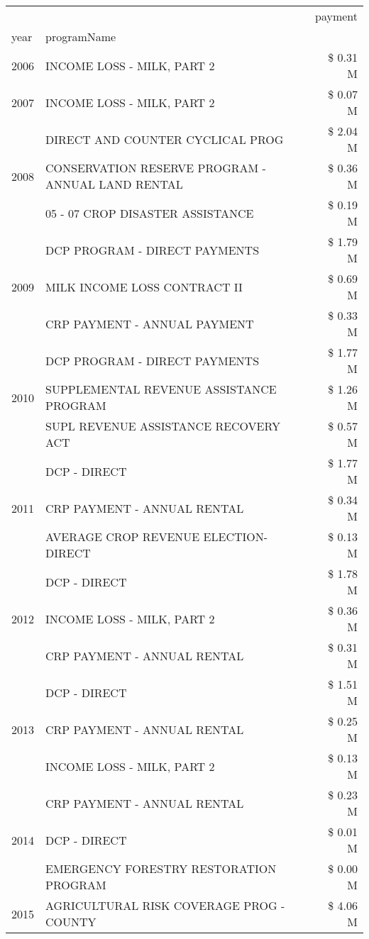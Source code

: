\begin{tabular}{llr}
\toprule
 &  & payment \\
year & programName &  \\
\midrule
2006 & INCOME LOSS - MILK, PART 2 & \$ 0.31 M \\
\cline{1-3}
2007 & INCOME LOSS - MILK, PART 2 & \$ 0.07 M \\
\cline{1-3}
\multirow[t]{3}{*}{2008} & DIRECT AND COUNTER CYCLICAL PROG & \$ 2.04 M \\
 & CONSERVATION RESERVE PROGRAM - ANNUAL LAND RENTAL & \$ 0.36 M \\
 & 05 - 07 CROP DISASTER ASSISTANCE & \$ 0.19 M \\
\cline{1-3}
\multirow[t]{3}{*}{2009} & DCP PROGRAM - DIRECT PAYMENTS & \$ 1.79 M \\
 & MILK INCOME LOSS CONTRACT II & \$ 0.69 M \\
 & CRP PAYMENT - ANNUAL PAYMENT & \$ 0.33 M \\
\cline{1-3}
\multirow[t]{3}{*}{2010} & DCP PROGRAM - DIRECT PAYMENTS & \$ 1.77 M \\
 & SUPPLEMENTAL REVENUE ASSISTANCE PROGRAM & \$ 1.26 M \\
 & SUPL REVENUE ASSISTANCE RECOVERY ACT & \$ 0.57 M \\
\cline{1-3}
\multirow[t]{3}{*}{2011} & DCP - DIRECT & \$ 1.77 M \\
 & CRP PAYMENT - ANNUAL RENTAL & \$ 0.34 M \\
 & AVERAGE CROP REVENUE ELECTION-DIRECT & \$ 0.13 M \\
\cline{1-3}
\multirow[t]{3}{*}{2012} & DCP - DIRECT & \$ 1.78 M \\
 & INCOME LOSS - MILK, PART 2 & \$ 0.36 M \\
 & CRP PAYMENT - ANNUAL RENTAL & \$ 0.31 M \\
\cline{1-3}
\multirow[t]{3}{*}{2013} & DCP - DIRECT & \$ 1.51 M \\
 & CRP PAYMENT - ANNUAL RENTAL & \$ 0.25 M \\
 & INCOME LOSS - MILK, PART 2 & \$ 0.13 M \\
\cline{1-3}
\multirow[t]{3}{*}{2014} & CRP PAYMENT - ANNUAL RENTAL & \$ 0.23 M \\
 & DCP - DIRECT & \$ 0.01 M \\
 & EMERGENCY FORESTRY RESTORATION PROGRAM & \$ 0.00 M \\
\cline{1-3}
\multirow[t]{3}{*}{2015} & AGRICULTURAL RISK COVERAGE PROG - COUNTY & \$ 4.06 M \\

\end{tabular}
